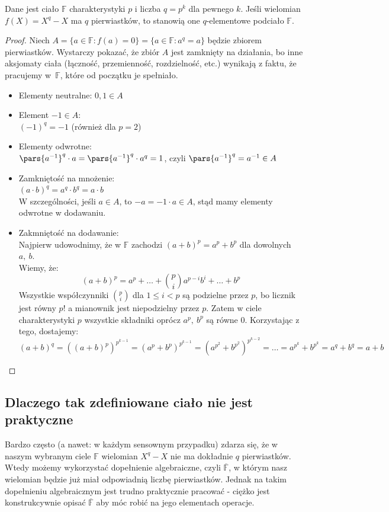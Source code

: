 \begin{theorem}
	Dane jest ciało \( \mathbb{F} \) charakterystyki \( p \) i liczba \( q = p^k \) dla pewnego \( k \). Jeśli wielomian \( f(X) = X^q - X \) ma \( q \) pierwiastków, to stanowią one \( q \)-elementowe podciało \( \mathbb{F} \).
\end{theorem}
\begin{proof}
	Niech \( A = \{a \in \mathbb{F}: f(a) = 0\} = \{a \in \mathbb{F}: a^q = a\} \) będzie zbiorem pierwiastków. Wystarczy pokazać, że zbiór \( A \) jest zamknięty na działania, bo inne aksjomaty ciała (łączność, przemienność, rozdzielność, etc.) wynikają z faktu, że pracujemy w~\( \mathbb{F} \), które od początku je spełniało.
	\begin{itemize}
		\item Elementy neutralne: \( 0, 1 \in A \)
		\item Element \( -1 \in A \): \\
		      \( (-1)^q = -1 \) (również dla \( p = 2 \))
		\item Elementy odwrotne: \\
		      \( \pars{a^{-1}}^q \cdot a = \pars{a^{-1}}^q \cdot a^q = 1 \), czyli \( \pars{a^{-1}}^q = a^{-1} \in A \)
		\item Zamkniętość na mnożenie: \\
		      \( (a \cdot b)^q = a^q \cdot b^q = a \cdot b \) \\
		      W szczególności, jeśli \( a \in A \), to \( -a = -1 \cdot a \in  A \), stąd mamy elementy odwrotne w dodawaniu.
		\item Zakmniętość na dodawanie: \\
		      Najpierw udowodnimy, że w \( \mathbb{F} \) zachodzi \( (a + b)^p = a^p + b^p \) dla dowolnych \( a, \ b \). \\
		      Wiemy, że:
		      \[
			      (a + b)^p = a^p + \ldots + {p \choose i}a^{p-i}b^i + \ldots + b^p
		      \]
		      Wszystkie współczynniki \( p \choose i \) dla \( 1 \leq i < p \) są podzielne przez \( p \), bo licznik jest równy \( p! \) \linebreak a mianownik jest niepodzielny przez \( p \).
		      Zatem w ciele charakterystyki \( p \) wszystkie składniki oprócz \( a^p, \ b^p \) są równe \( 0 \).
		      Korzystając z tego, dostajemy:
		      \[
			      (a + b)^q = ((a + b)^p)^{p^{k-1}} = (a^p + b^p)^{p^{k-1}} = (a^{p^2} + b^{p^2})^{p^{k-2}} = \ldots = a^{p^k} + b^{p^k} = a^q + b^q = a + b
		      \]
	\end{itemize}
\end{proof}

\subsection{Dlaczego tak zdefiniowane ciało nie jest praktyczne}
Bardzo często (a nawet: w każdym sensownym przypadku) zdarza się, że w naszym wybranym ciele \(\mathbb{F}\) wielomian \(X^q - X\) nie ma dokładnie \(q\) pierwiastków. Wtedy możemy wykorzystać dopełnienie algebraiczne, czyli \(\overline{\mathbb{F}}\), w którym nasz wielomian będzie już miał odpowiadnią liczbę pierwiastków. Jednak na takim dopełnieniu algebraicznym jest trudno praktycznie pracować - ciężko jest konstrukcywnie opisać \(\overline{\mathbb{F}}\) aby móc robić na jego elementach operacje.
